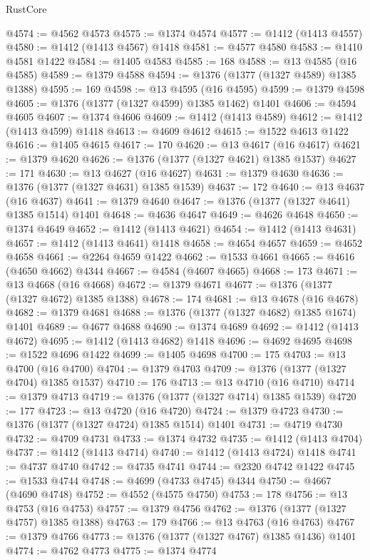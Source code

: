 \begin{lexlean}{RustCore}
\begin{coremodule}
@4574 := @4562 @4573
@4575 := @1374 @4574
@4577 := @1412 (@1413 @4557)
@4580 := @1412 (@1413 @4567) @1418
@4581 := @4577 @4580
@4583 := @1410 @4581 @1422
@4584 := @1405 @4583
@4585 := 168
@4588 := @13 @4585 (@16 @4585)
@4589 := @1379 @4588
@4594 := @1376 (@1377 (@1327 @4589) @1385 @1388)
@4595 := 169
@4598 := @13 @4595 (@16 @4595)
@4599 := @1379 @4598
@4605 := @1376 (@1377 (@1327 @4599) @1385 @1462) @1401
@4606 := @4594 @4605
@4607 := @1374 @4606
@4609 := @1412 (@1413 @4589)
@4612 := @1412 (@1413 @4599) @1418
@4613 := @4609 @4612
@4615 := @1522 @4613 @1422
@4616 := @1405 @4615
@4617 := 170
@4620 := @13 @4617 (@16 @4617)
@4621 := @1379 @4620
@4626 := @1376 (@1377 (@1327 @4621) @1385 @1537)
@4627 := 171
@4630 := @13 @4627 (@16 @4627)
@4631 := @1379 @4630
@4636 := @1376 (@1377 (@1327 @4631) @1385 @1539)
@4637 := 172
@4640 := @13 @4637 (@16 @4637)
@4641 := @1379 @4640
@4647 := @1376 (@1377 (@1327 @4641) @1385 @1514) @1401
@4648 := @4636 @4647
@4649 := @4626 @4648
@4650 := @1374 @4649
@4652 := @1412 (@1413 @4621)
@4654 := @1412 (@1413 @4631)
@4657 := @1412 (@1413 @4641) @1418
@4658 := @4654 @4657
@4659 := @4652 @4658
@4661 := @2264 @4659 @1422
@4662 := @1533 @4661
@4665 := @4616 (@4650 @4662) @4344
@4667 := @4584 (@4607 @4665)
@4668 := 173
@4671 := @13 @4668 (@16 @4668)
@4672 := @1379 @4671
@4677 := @1376 (@1377 (@1327 @4672) @1385 @1388)
@4678 := 174
@4681 := @13 @4678 (@16 @4678)
@4682 := @1379 @4681
@4688 := @1376 (@1377 (@1327 @4682) @1385 @1674) @1401
@4689 := @4677 @4688
@4690 := @1374 @4689
@4692 := @1412 (@1413 @4672)
@4695 := @1412 (@1413 @4682) @1418
@4696 := @4692 @4695
@4698 := @1522 @4696 @1422
@4699 := @1405 @4698
@4700 := 175
@4703 := @13 @4700 (@16 @4700)
@4704 := @1379 @4703
@4709 := @1376 (@1377 (@1327 @4704) @1385 @1537)
@4710 := 176
@4713 := @13 @4710 (@16 @4710)
@4714 := @1379 @4713
@4719 := @1376 (@1377 (@1327 @4714) @1385 @1539)
@4720 := 177
@4723 := @13 @4720 (@16 @4720)
@4724 := @1379 @4723
@4730 := @1376 (@1377 (@1327 @4724) @1385 @1514) @1401
@4731 := @4719 @4730
@4732 := @4709 @4731
@4733 := @1374 @4732
@4735 := @1412 (@1413 @4704)
@4737 := @1412 (@1413 @4714)
@4740 := @1412 (@1413 @4724) @1418
@4741 := @4737 @4740
@4742 := @4735 @4741
@4744 := @2320 @4742 @1422
@4745 := @1533 @4744
@4748 := @4699 (@4733 @4745) @4344
@4750 := @4667 (@4690 @4748)
@4752 := @4552 (@4575 @4750)
@4753 := 178
@4756 := @13 @4753 (@16 @4753)
@4757 := @1379 @4756
@4762 := @1376 (@1377 (@1327 @4757) @1385 @1388)
@4763 := 179
@4766 := @13 @4763 (@16 @4763)
@4767 := @1379 @4766
@4773 := @1376 (@1377 (@1327 @4767) @1385 @1436) @1401
@4774 := @4762 @4773
@4775 := @1374 @4774

\end{coremodule}
\end{lexlean}
